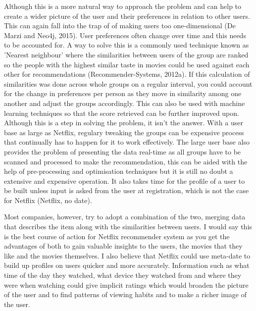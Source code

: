 \documentclass[a4paper]{article}
\begin{document}
Although this is a more natural way to approach the problem and can help to create a wider picture of the user and their preferences in relation to other users. This can again fall into the trap of of making users too one-dimensional (De Marzi and Neo4j, 2015). User preferences often change over time and this needs to be accounted for. A way to solve this is a commonly used technique known as 'Nearest neighbour' where the similarities between users of the group are ranked so the people with the highest similar taste in movies could be used against each other for recommendations (Recommender-Systems, 2012a). If this calculation of similarities was done across whole groups on a regular interval, you could account for the change in preferences per person as they move in similarity among one another and adjust the groups accordingly. This can also be used with machine learning techniques so that the score retrieved can be further improved upon. Although this is a step in solving the problem, it isn't the answer. With a user base as large as Netflix, regulary tweaking the groups can be expensive process that continually has to happen for it to work effectively. The large user base also provides the problem of presenting the data real-time as all groups have to be scanned and processed to make the recommendation, this can be aided with the help of pre-processing and optimisation techniques but it is still no doubt a extensive and expensive operation. It also takes time for the profile of a user to be built unless input is asked from the user at registration, which is not the case for Netflix (Netflix, no date).

Most companies, however, try to adopt a combination of the two, merging data that describes the item along with the similarities between users. I would say this is the best course of action for Netflix recommender system as you get the advantages of both to gain valuable insights to the users, the movies that they like and the movies themselves. I also believe that Netflix could use meta-date to build up profiles on users quicker and more accurately. Information such as what time of the day they watched, what device they watched from and where they were when watching could give implicit ratings which would broaden the picture of the user and to find patterns of viewing habits and to make a richer image of the user.
\end{document}
